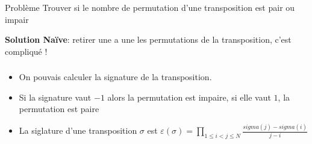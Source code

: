 
\begin{frame}
    \frametitle{\problemtitle}
        \begin{block}
            {Problème} Trouver si le nombre de permutation d'une transposition est pair ou impair
        \end{block}
        \pause
        \textbf{Solution Naïve}: retirer une a une les permutations de la transposition, c'est compliqué !
\end{frame}

\begin{frame}
    \frametitle{\problemtitle}
    \begin{itemize}
        \item<+-> On pouvais calculer la signature de la transposition.
        \item<+-> Si la signature vaut $-1$ alors la permutation est impaire, si elle vaut $1$, la permutation est paire
        \item<+-> La siglature d'une transposition $\sigma$ est $\varepsilon(\sigma) = \prod_{1\leq i < j \leq N} \frac{sigma(j)-sigma(i)}{j-i}$
    \end{itemize}
\end{frame}
